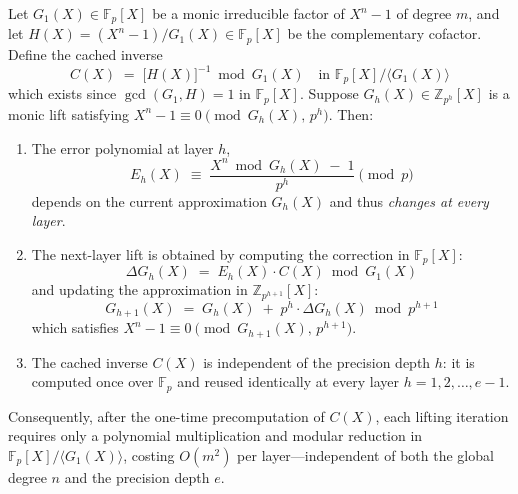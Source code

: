 \documentclass[10pt,a4paper]{amsart}
\begin{document}
\begin{thm} \label{thm:cofactor_free}
Let $G_1(X) \in \mathbb{F}_p[X]$ be a monic irreducible factor of $X^n - 1$ of degree $m$, and let $H(X) = (X^n - 1)/G_1(X) \in \mathbb{F}_p[X]$ be the complementary cofactor. Define the cached inverse
\begin{equation}
    C(X) \;=\; \bigl[H(X)\bigr]^{-1} \bmod G_1(X) \quad \text{in } \mathbb{F}_p[X]/\langle G_1(X) \rangle
\end{equation}
which exists since $\gcd(G_1, H) = 1$ in $\mathbb{F}_p[X]$. Suppose $G_h(X) \in \mathbb{Z}_{p^h}[X]$ is a monic lift satisfying $X^n - 1 \equiv 0 \pmod{G_h(X), \, p^h}$. Then:

\begin{enumerate}
    \item[\textup{(1)}] The error polynomial at layer $h$,
    \begin{equation}
        E_h(X) \;\equiv\; \frac{X^n \bmod G_h(X) \;-\; 1}{p^h} \pmod{p}
    \end{equation}
    depends on the current approximation $G_h(X)$ and thus \emph{changes at every layer}.
    
    \item[\textup{(2)}] The next-layer lift is obtained by computing the correction in $\mathbb{F}_p[X]$:
    \begin{equation} \label{eq:cofactor_free_correction}
        \Delta G_h(X) \;=\; E_h(X) \cdot C(X) \bmod G_1(X)
    \end{equation}
    and updating the approximation in $\mathbb{Z}_{p^{h+1}}[X]$:
    \begin{equation} \label{eq:cofactor_free_update}
        G_{h+1}(X) \;=\; G_h(X) \;+\; p^h \cdot \Delta G_h(X) \bmod p^{h+1}
    \end{equation}
    which satisfies $X^n - 1 \equiv 0 \pmod{G_{h+1}(X), \, p^{h+1}}$.
    
    \item[\textup{(3)}] The cached inverse $C(X)$ is independent of the precision depth $h$: it is computed once over $\mathbb{F}_p$ and reused identically at every layer $h = 1, 2, \dots, e-1$.
\end{enumerate}
Consequently, after the one-time precomputation of $C(X)$, each lifting iteration requires only a polynomial multiplication and modular reduction in $\mathbb{F}_p[X]/\langle G_1(X) \rangle$, costing $O(m^2)$ per layer---independent of both the global degree $n$ and the precision depth $e$.
\end{thm}
\end{document}
